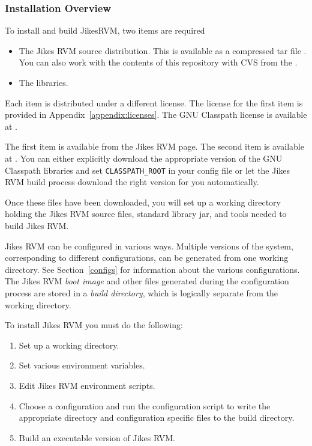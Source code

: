 \subsubsection{Installation Overview}\label{sec:installDetails}

To install and build Jikes\trademark RVM, two items are required
\begin{itemize}
\item The Jikes RVM source distribution.  This is available as a
compressed tar file {\tt \RVMTarFile}.  You can also work with the
contents of this repository with CVS from the 
.

\item The 
 libraries. 
\end{itemize}

Each item is distributed under a different license.  The license for
the first item is provided in Appendix~\ref{appendix:licenses}.  The
GNU Classpath license is available at \xlink{{\tt
\classpathURL}}{\classpathURL}. 

The first item is available  from the Jikes RVM
 page. The second item is available at
\xlink{{\tt \classpathURL}}{\classpathURL}.
You can either explicitly download the appropriate version of the GNU
Classpath libraries and set {\tt CLASSPATH\_ROOT} in your config file or let
the Jikes RVM build process download the right version for you
automatically.

Once these files have been downloaded, you will set up 
a working directory holding the Jikes RVM source files, standard
library jar, and tools needed to build Jikes RVM. 

Jikes RVM can be configured in various ways. Multiple versions of the system,
corresponding to different configurations, can be generated from 
one working directory. See Section~\ref{configs} for information about the 
various 
configurations.
The Jikes RVM  {\em boot image} and other files generated during the 
configuration process
are stored in a {\em build directory}, which is logically separate from 
the working directory. 

To install Jikes RVM  you must do the following:
\begin{enumerate}
\item Set up a working directory.
\item Set various environment variables.
\item Edit Jikes RVM environment scripts.
\item Choose a configuration and run the configuration script to write
the appropriate directory and configuration specific files to the
build directory.
\item Build an executable version of Jikes RVM.
\end{enumerate}

